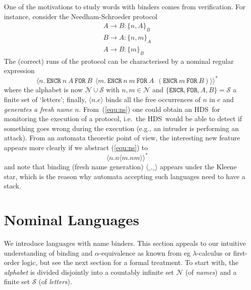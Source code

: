 \documentclass[runningheads,a4paper]{llncs}
\newcommand{\hdns}{HDS}
\newcommand{\enc}[2]{\{#1\}_{#2}}
\newcommand{\names}{\mbox{$\mathcal{N}$}}
\begin{document}
\noindent One of the motivations to study words with binders comes
from verification. For instance, consider the Needham-Schroeder
protocol
\[\begin{array}{l}
 A \to B: \enc{n, A} B \\
 B \to A: \enc{n, m} A \\
 A \to B: \enc m B
\end{array}\]
The (correct) runs of the protocol can be characterised by a nominal
regular expression
\begin{equation}\label{equ:ns}
 \langle n . \ \mathtt{ENCR}\ n\ A\ \mathtt{FOR}\ B \ \
 \langle m . \ \mathtt{ENCR}\ n\ m\ \mathtt{FOR}\ A \ \
 (\mathtt{ENCR}\ m\ \mathtt{FOR}\ B)\rangle\rangle^\ast
\end{equation}
where the alphabet is now $\names\cup\mathcal{S}$ with $n,m\in\names$
and $\{\mathtt{ENCR},\mathtt{FOR},A,B\}=\mathcal{S}$ a finite set of
`letters'; finally, $\langle n.e \rangle$ binds all the free
occurrences of $n$ in $e$ and \emph{generates a fresh name} $n$.
From~(\ref{equ:ns}) one could obtain an \hdns\ for monitoring the
execution of a protocol, i.e.\ the \hdns\ would be able to detect if
something goes wrong during the execution (e.g., an intruder is
performing an attack). From an automata theoretic point of view, the
interesting new feature appears more clearly if we abstract
(\ref{equ:ns}) to
\begin{equation}\label{equ:ns2}
 \langle n . n \langle m . nm \rangle\rangle^\ast
\end{equation}
and note that binding (fresh name generation) $\langle\_.\_\rangle$
appears under the Kleene star, which is the reason why automata
accepting such languages need to have a stack.

\section{Nominal Languages}\label{sec:nomlang}
\newcommand{\letters}{\mathcal{S}}
\newcommand{\mwords}{\mathbf{M}}
\newcommand{\gwords}{\mathbf{G}}
\newcommand{\lwords}{\mathbf{L}}
\newcommand{\swords}{\mathbf{S}}
\newcommand{\sltr}{\mathrm{sl}}
\newcommand{\lgtr}{\mathrm{lg}}
\newcommand{\gmtr}{\mathrm{gm}}
\newcommand{\mpwtr}{f_\mwords}



We introduce languages with name binders. This section appeals to our
intuitive understanding of binding and $\alpha$-equivalence as known
from eg $\lambda$-calculus or first-order logic, but see the next
section for a formal treatment.
To start with, the \emph{alphabet} is divided disjointly into a
countably infinite set $\names$ (of \emph{names}) and a finite set
$\mathcal{S}$ (of \emph{letters}).
\end{document}
